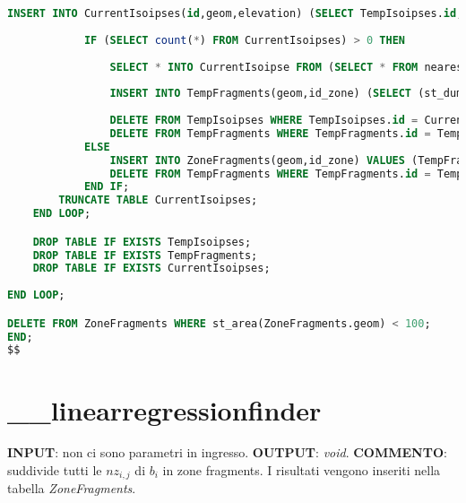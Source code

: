 \begin{lstlisting}[language=SQL]
		INSERT INTO CurrentIsoipses(id,geom,elevation) (SELECT TempIsoipses.id,(st_dump(st_collectionextract(st_intersection(TempIsoipses.geom,TempFragment.geom),2))).geom as geom,TempIsoipses.elevation FROM TempIsoipses);
		
			IF (SELECT count(*) FROM CurrentIsoipses) > 0 THEN
				
				SELECT * INTO CurrentIsoipse FROM (SELECT * FROM nearestisoipses WHERE (SELECT id From CurrentIsoipses LIMIT 1) = nearestisoipses.id) as currentiso;
				
				INSERT INTO TempFragments(geom,id_zone) (SELECT (st_dump(st_collectionextract(st_split(TempFragment.geom,CurrentIsoipse.geom),3))).geom, zoneCorrente.id);
				
				DELETE FROM TempIsoipses WHERE TempIsoipses.id = CurrentIsoipse.id;
				DELETE FROM TempFragments WHERE TempFragments.id = TempFragment.id;
			ELSE
				INSERT INTO ZoneFragments(geom,id_zone) VALUES (TempFragment.geom,TempFragment.id_zone);
				DELETE FROM TempFragments WHERE TempFragments.id = TempFragment.id;
			END IF;
		TRUNCATE TABLE CurrentIsoipses;
	END LOOP;

	DROP TABLE IF EXISTS TempIsoipses;
	DROP TABLE IF EXISTS TempFragments;
	DROP TABLE IF EXISTS CurrentIsoipses;
	
END LOOP;

DELETE FROM ZoneFragments WHERE st_area(ZoneFragments.geom) < 100;
END;
$$
\end{lstlisting}

\section{\_\_linearregressionfinder}
\textbf{INPUT}: non ci sono parametri in ingresso. \newline
\textbf{OUTPUT}: \textit{void}. \newline
\textbf{COMMENTO}: suddivide tutti le $nz_{i,j}$ di $b_i$ in zone fragments. I risultati vengono inseriti nella tabella \textit{ZoneFragments}.

